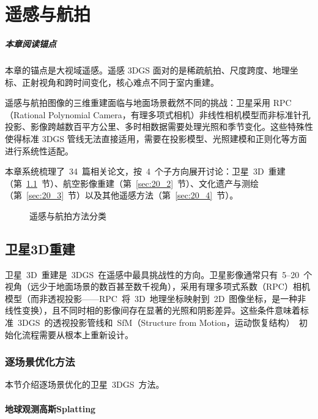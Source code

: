 \chapter{遥感与航拍}
\label{ch:20}

\paragraph*{本章阅读锚点}
本章的锚点是大视域遥感。遥感 3DGS 面对的是稀疏航拍、尺度跨度、地理坐标、正射视角和跨时间变化，核心难点不同于室内重建。


遥感与航拍图像的三维重建面临与地面场景截然不同的挑战：卫星采用 RPC（Rational Polynomial Camera，有理多项式相机）非线性相机模型而非标准针孔投影、影像跨越数百平方公里、多时相数据需要处理光照和季节变化。这些特殊性使得标准 3DGS 管线无法直接适用，需要在投影模型、光照建模和正则化等方面进行系统性适配。

本章系统梳理了~34~篇相关论文，按~4~个子方向展开讨论：卫星~3D~重建（第~\ref{sec:20_1}~节）、航空影像重建（第~\ref{sec:20_2}~节）、文化遗产与测绘（第~\ref{sec:20_3}~节）以及其他遥感方法（第~\ref{sec:20_4}~节）。

\begin{figure}[htbp]
\centering
\resizebox{\textwidth}{!}{}
\caption{遥感与航拍方法分类}
\label{fig:ch20_remote_sensing_taxonomy}
\end{figure}

\section{卫星3D重建}
\label{sec:20_1}

卫星~3D~重建是~3DGS~在遥感中最具挑战性的方向。卫星影像通常只有~5--20~个视角（远少于地面场景的数百甚至数千视角），采用有理多项式系数（RPC）相机模型（而非透视投影——RPC~将~3D~地理坐标映射到~2D~图像坐标，是一种非线性变换），且不同时相的影像间存在显著的光照和阴影差异。这些条件意味着标准~3DGS~的透视投影管线和~SfM（Structure from Motion，运动恢复结构）~初始化流程需要从根本上重新设计。

\subsection{逐场景优化方法}
\label{ss:20_1}

本节介绍逐场景优化的卫星~3DGS~方法。

\subsubsection{地球观测高斯Splatting}

